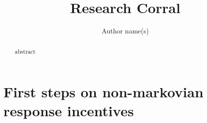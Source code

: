 \documentclass[letterpaper,10pt]{article}
\begin{document}
\title{Research Corral}

\author{Author name(s)}
\address{Author affiliation and full address}


\begin{abstract}
abstract
\end{abstract}


\section{First steps on non-markovian response incentives}

\end{document}
